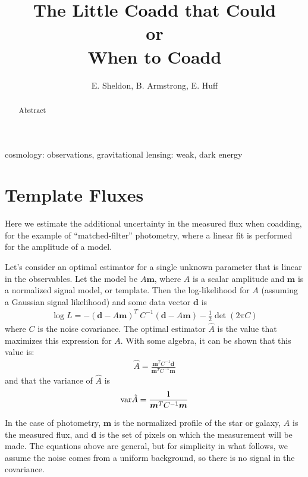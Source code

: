\documentclass[a4paper,fleqn,usenatbib,referee]{mnras}
\title{The Little Coadd that Could\\
or\\
When to Coadd}
\author[E. Sheldon, B. Armstrong, E. Huff]{E. Sheldon, B. Armstrong, E. Huff}
\begin{document}
\maketitle

\begin{abstract}

    Abstract

\end{abstract}


\begin{keywords}                                                                    
    cosmology: observations,
    gravitational lensing: weak,
    dark energy
\end{keywords} 

\section{Template Fluxes} \label{sec:template}

Here we estimate the additional uncertainty in the measured flux when coadding,
for the example of ``matched-filter'' photometry, where a linear fit is performed
for the amplitude of a model.

Let's consider an optimal estimator for a single unknown parameter that is
linear in the observables. Let the model be $A\boldsymbol{m}$, where $A$ is a
scalar amplitude and $\boldsymbol{m}$ is a normalized signal model, or
template. Then the log-likelihood for $A$ (assuming a Gaussian signal
likelihood) and some data vector $\boldsymbol{d}$ is
\begin{align}
  \log L = - (\boldsymbol{d} - A\boldsymbol{m})^T\: C^{-1} (\boldsymbol{d} - A\boldsymbol{m}) - \frac{1}{2} \det(2\pi C )
\end{align}
where $C$ is the noise covariance.  The optimal estimator $\hat{A}$ is the
value that maximizes this expression for $A$. With some algebra, it can be
shown that this value is:
\begin{align}
\hat{A} = \frac{\boldsymbol{m}^T C^{-1} \boldsymbol{d}}{\boldsymbol{m}^T C^{-1} \boldsymbol{m}}
\end{align}
and that the variance of $\hat{A}$ is
\begin{align}
{\rm var}\hat{A} = \frac{1}{{\boldsymbol{m}^T C^{-1} \boldsymbol{m}}}
\end{align}

In the case of photometry, $\boldsymbol{m}$ is the normalized profile of the
star or galaxy, $A$ is the measured flux, and $\boldsymbol{d}$ is the set of
pixels on which the measurement will be made.  The equations above are general,
but for simplicity in what follows, we assume the noise comes from a uniform
background, so there is no signal in the covariance.
\end{document}
